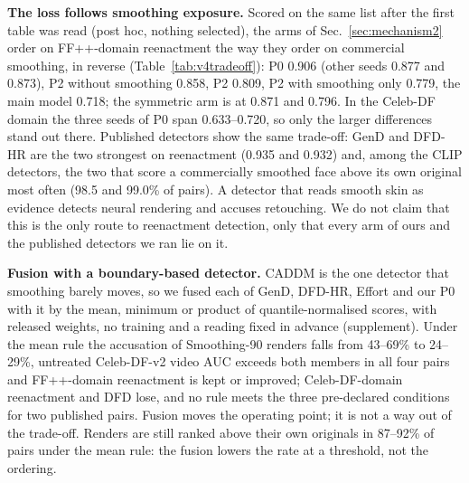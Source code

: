 \documentclass[conference]{IEEEtran}
\begin{document}
\textbf{The loss follows smoothing exposure.} Scored on the same list after the first table was read (post hoc,
nothing selected), the arms of Sec.~\ref{sec:mechanism2} order on FF++-domain reenactment the way they order on
commercial smoothing, in reverse (Table~\ref{tab:v4tradeoff}): P0 0.906 (other seeds 0.877 and 0.873), P2 without
smoothing 0.858, P2 0.809, P2 with smoothing only 0.779, the main model 0.718; the symmetric arm is at 0.871 and 0.796.
In the Celeb-DF domain the three seeds of P0 span 0.633--0.720, so only the larger differences stand out there.
Published detectors show the same trade-off: GenD and DFD-HR are the two strongest on reenactment (0.935 and 0.932)
and, among the CLIP detectors, the two that score a commercially smoothed face above its own original most often (98.5
and 99.0\% of pairs). A detector that reads smooth skin as evidence detects neural rendering and accuses retouching. We
do not claim that this is the only route to reenactment detection, only that every arm of ours and the published
detectors we ran lie on it.

\textbf{Fusion with a boundary-based detector.} CADDM is the one detector that smoothing barely moves, so we fused each
of GenD, DFD-HR, Effort and our P0 with it by the mean, minimum or product of quantile-normalised scores, with released
weights, no training and a reading fixed in advance (supplement). Under the mean rule the accusation of Smoothing-90
renders falls from 43--69\% to 24--29\%, untreated Celeb-DF-v2 video AUC exceeds both members in all four pairs and
FF++-domain reenactment is kept or improved; Celeb-DF-domain reenactment and DFD lose, and no rule meets the three
pre-declared conditions for two published pairs.
Fusion moves the operating point; it is not a way out of the trade-off. Renders are still ranked above their own
originals in 87--92\% of pairs under the mean rule: the fusion lowers the rate at a threshold, not the ordering.
\end{document}
